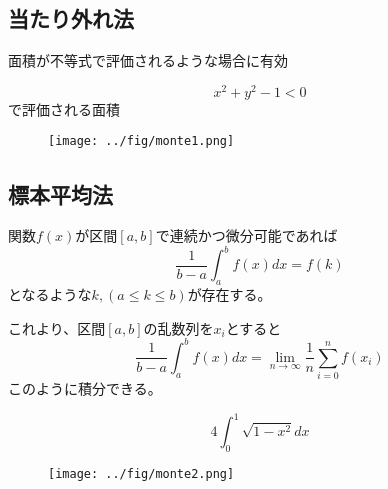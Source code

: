 \documentclass[dvipdfmx]{beamer}
\begin{document}
    \subsection{当たり外れ法}
    \begin{frame}{\insertsubsection}
        面積が不等式で評価されるような場合に有効
        \begin{example}
            \begin{equation}
                x^2 + y^2 -1 < 0
            \end{equation}
            で評価される面積
        \end{example}

        \begin{figure}
            \texttt{[image: ../fig/monte1.png]}
        \end{figure}
    \end{frame}

    \subsection{標本平均法}
    \begin{frame}{\insertsubsection}
        \begin{Theorem}[積分の平均値の定理]
            関数$f(x)$が区間$[a,b]$で連続かつ微分可能であれば
            \begin{equation}
                \dfrac{1}{b-a}\int_a^b f(x) dx = f(k)
            \end{equation}
            となるような$k,(a\leq k \leq b)$が存在する。
        \end{Theorem}
        これより、区間$[a,b]$の乱数列を$x_i$とすると
        \begin{equation}
            \dfrac{1}{b-a}\int_a^b f(x) dx = \lim_{n\to\infty}\dfrac{1}{n}\sum_{i=0}^n f(x_i)
        \end{equation}
        このように積分できる。
    \end{frame}

    \begin{frame}
        \begin{example}
            \begin{equation}
                4\int_0^1 \sqrt{1-x^2} dx
            \end{equation}
        \end{example}

        \begin{figure}
            \texttt{[image: ../fig/monte2.png]}
        \end{figure}
    \end{frame}
\end{document}
